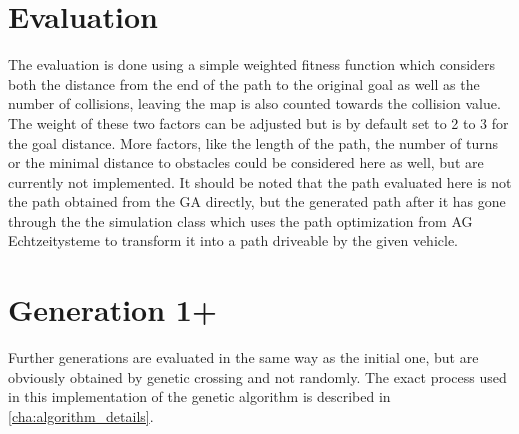 \section{Evaluation} %
\label{sec:evaluation}

The evaluation is done using a simple weighted fitness function which considers both the distance from the end of the path to the original goal as well as the number of collisions, leaving the map is also counted towards the collision value. The weight of these two factors can be adjusted but is by default set to 2 to 3 for the goal distance. More factors, like the length of the path, the number of turns or the minimal distance to obstacles could be considered here as well, but are currently not implemented. It should be noted that the path evaluated here is not the path obtained from the GA directly, but the generated path after it has gone through the the simulation class which uses the path optimization from AG Echtzeitysteme to transform it into a path driveable by the given vehicle. 

\section{Generation 1+} %
\label{sec:generation_1+}

Further generations are evaluated in the same way as the initial one, but are obviously obtained by genetic crossing and not randomly. The exact process used in this implementation of the genetic algorithm is described in \ref{cha:algorithm_details}.

